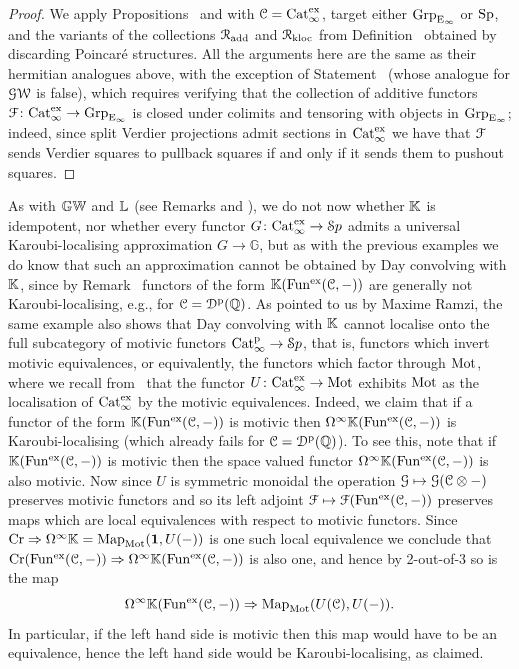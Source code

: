 \begin{proof}
We apply Propositions~ and 
with $\mathcal C=\mathrm{Cat}_\infty^{\mathrm{ex}}$, target either $\operatorname{Grp}_{{\mathrm{E}_{\infty}}}$ or $\mathrm{Sp}$, and the variants of the collections $\mathcal{R}_{\mathrm{add}}$ and $\mathcal{R}_{\mathrm{kloc}}$ from Definition~ obtained by discarding Poincar\'e structures. All the arguments here are the same as their hermitian analogues above, with the exception of Statement~ (whose analogue for $\operatorname{\mathcal{GW}}$ is false), which requires verifying that the collection of additive functors $\mathcal{F}\colon \mathrm{Cat}_\infty^{\mathrm{ex}} \to \operatorname{Grp}_{{\mathrm{E}_{\infty}}}$ is closed under colimits and tensoring with objects in $\operatorname{Grp}_{{\mathrm{E}_{\infty}}}$; indeed, since split Verdier projections admit sections in $\mathrm{Cat}_\infty^{\mathrm{ex}}$ we have that $\mathcal{F}$ sends Verdier squares to pullback squares if and only if it sends them to pushout squares.
\end{proof}


\begin{remark}
\label{remark:KK-not-convolving}%
As with $\mathbb{GW}$ and $\mathbb{L}$ (see Remarks  and ), we do not now whether $\mathbb K$ is idempotent, nor whether every functor $G\colon \mathrm{Cat}_\infty^{\mathrm{ex}} \to {\mathcal Sp}$ admits a universal Karoubi-localising approximation $G \to \mathbb{G}$, but as with the previous examples we do know that such an approximation cannot be obtained by Day convolving with $\mathbb K$, since by Remark~ functors of the form $\mathbb K(\operatorname{Fun^{ex}}(\mathcal C,-))$ are generally not Karoubi-localising, e.g., for $\mathcal C = {\mathcal D}^{\mathrm{p}}(\mathbb{Q})$.
As pointed to us by Maxime Ramzi, the same example also shows that Day convolving with $\mathbb K$ cannot localise onto the full subcategory of motivic functors $\mathrm{Cat}^{\mathrm p}_\infty \to {\mathcal Sp}$, that is, functors which invert motivic equivalences, or equivalently, the functors which factor through $\Mot$, where we recall from~\cite{ramzi-motivic} that the functor $U\colon \Catx \to \Mot$ exhibits $\Mot$ as the localisation of $\mathrm{Cat}_\infty^{\mathrm{ex}}$ by the motivic equivalences. Indeed, we claim that if a functor of the form $\mathbb K(\operatorname{Fun^{ex}}(\mathcal C,-))$ is motivic then $\Omega^{\infty}\mathbb K(\operatorname{Fun^{ex}}(\mathcal C,-))$ is Karoubi-localising (which already fails for $\mathcal C = {\mathcal D}^{\mathrm{p}}(\mathbb{Q})$). 
To see this, note that if $\mathbb K(\operatorname{Fun^{ex}}(\mathcal C,-))$ is motivic then the space valued functor $\Omega^{\infty}\mathbb K(\operatorname{Fun^{ex}}(\mathcal C,-))$ is also motivic. Now since $U$ is symmetric monoidal the operation $\mathcal{G} \mapsto \mathcal{G}(\mathcal C\otimes-)$ preserves motivic functors and so its left adjoint $\mathcal{F} \mapsto \mathcal{F}(\operatorname{Fun^{ex}}(\mathcal C,-))$ preserves maps which are local equivalences with respect to motivic functors. Since $\core\Rightarrow \Om^{\infty}\KK = \Map_{\Mot}(\one,U(-))$ is one such local equivalence we conclude that $\mathrm{Cr}(\operatorname{Fun^{ex}}(\mathcal C,-)) \Rightarrow \Omega^{\infty}\mathbb K(\operatorname{Fun^{ex}}(\mathcal C,-))$ is also one, and hence by 2-out-of-3 so is the map
\[
\Om^{\infty}\KK(\Funx(\C,-)) \Rightarrow \Map_{\Mot}(U(\C),U(-)) .
\]
In particular, if the left hand side is motivic then this map would have to be an equivalence, hence the left hand side would be Karoubi-localising, as claimed.
\end{remark}

